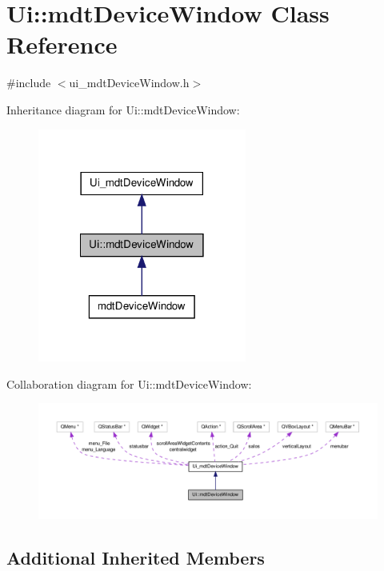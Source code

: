 \hypertarget{class_ui_1_1mdt_device_window}{\section{Ui\-:\-:mdt\-Device\-Window Class Reference}
\label{class_ui_1_1mdt_device_window}
}


{\ttfamily \#include $<$ui\-\_\-mdt\-Device\-Window.\-h$>$}



Inheritance diagram for Ui\-:\-:mdt\-Device\-Window\-:\nopagebreak
\begin{figure}[H]
\begin{center}
\leavevmode
\includegraphics[width=194pt]{class_ui_1_1mdt_device_window__inherit__graph}
\end{center}
\end{figure}


Collaboration diagram for Ui\-:\-:mdt\-Device\-Window\-:\nopagebreak
\begin{figure}[H]
\begin{center}
\leavevmode
\includegraphics[width=350pt]{class_ui_1_1mdt_device_window__coll__graph}
\end{center}
\end{figure}
\subsection*{Additional Inherited Members}


